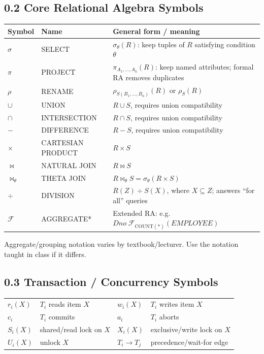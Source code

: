 \documentclass[10pt,a4paper]{article}
\begin{document}
\subsection{0.2 Core Relational Algebra Symbols}
\begin{center}
\begin{tabularx}{\textwidth}{>{\centering\arraybackslash}p{2.1cm} p{3cm} X}
\toprule
\textbf{Symbol} & \textbf{Name} & \textbf{General form / meaning}\\
\midrule
$\sigma$ & SELECT & $\sigma_{\theta}(R)$: keep tuples of $R$ satisfying condition $\theta$\\
$\pi$ & PROJECT & $\pi_{A_1,\ldots,A_k}(R)$: keep named attributes; formal RA removes duplicates\\
$\rho$ & RENAME & $\rho_{S(B_1,\ldots,B_n)}(R)$ or $\rho_S(R)$\\
$\cup$ & UNION & $R\cup S$, requires union compatibility\\
$\cap$ & INTERSECTION & $R\cap S$, requires union compatibility\\
$-$ & DIFFERENCE & $R-S$, requires union compatibility\\
$\times$ & CARTESIAN PRODUCT & $R\times S$\\
$\bowtie$ & NATURAL JOIN & $R\bowtie S$\\
$\bowtie_{\theta}$ & THETA JOIN & $R\bowtie_{\theta}S = \sigma_{\theta}(R\times S)$\\
$\div$ & DIVISION & $R(Z)\div S(X)$, where $X\subseteq Z$; answers ``for all'' queries\\
$\mathcal{F}$ & AGGREGATE* & Extended RA: e.g. $Dno\;\mathcal{F}_{\mathrm{COUNT}(*)}(EMPLOYEE)$\\
\bottomrule
\end{tabularx}
\end{center}
\footnotesize *Aggregate/grouping notation varies by textbook/lecturer. Use the notation taught in class if it differs.\normalsize

\subsection{0.3 Transaction / Concurrency Symbols}
\begin{center}
\begin{tabularx}{\textwidth}{p{2.3cm} X p{2.5cm} X}
\toprule
$r_i(X)$ & $T_i$ reads item $X$ & $w_i(X)$ & $T_i$ writes item $X$\\
$c_i$ & $T_i$ commits & $a_i$ & $T_i$ aborts\\
$S_i(X)$ & shared/read lock on $X$ & $X_i(X)$ & exclusive/write lock on $X$\\
$U_i(X)$ & unlock $X$ & $T_i\to T_j$ & precedence/wait-for edge\\
\bottomrule
\end{tabularx}
\end{center}
\end{document}
